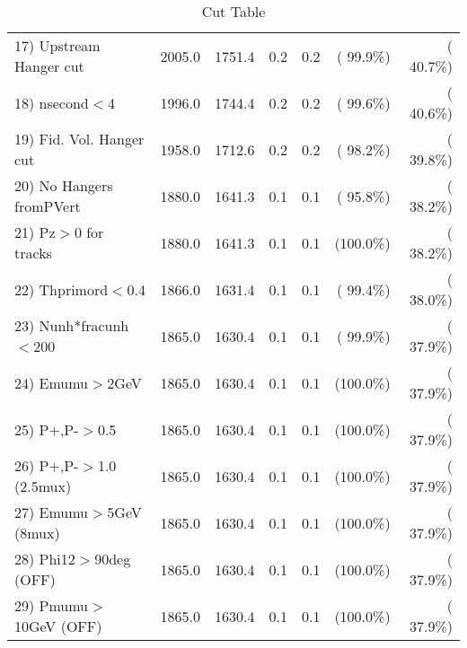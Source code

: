 \begin{table}[h!]
\begin{tabular}{||l||r|r|r|r|r|r||}
 17) Upstream Hanger cut  &       2005.0 &       1751.4 &          0.2 &          0.2 & ( 99.9\%) & ( 40.7\%) \\
 18) nsecond$<$4          &       1996.0 &       1744.4 &          0.2 &          0.2 & ( 99.6\%) & ( 40.6\%) \\
 19) Fid. Vol. Hanger cut &       1958.0 &       1712.6 &          0.2 &          0.2 & ( 98.2\%) & ( 39.8\%) \\
 20) No Hangers fromPVert &       1880.0 &       1641.3 &          0.1 &          0.1 & ( 95.8\%) & ( 38.2\%) \\
 21) Pz$>$0 for tracks    &       1880.0 &       1641.3 &          0.1 &          0.1 & (100.0\%) & ( 38.2\%) \\
 22) Thprimord$<$0.4      &       1866.0 &       1631.4 &          0.1 &          0.1 & ( 99.4\%) & ( 38.0\%) \\
 23) Nunh*fracunh$<$200   &       1865.0 &       1630.4 &          0.1 &          0.1 & ( 99.9\%) & ( 37.9\%) \\
 24) Emumu$>$2GeV         &       1865.0 &       1630.4 &          0.1 &          0.1 & (100.0\%) & ( 37.9\%) \\
 25) P+,P-$>$0.5          &       1865.0 &       1630.4 &          0.1 &          0.1 & (100.0\%) & ( 37.9\%) \\
 26) P+,P-$>$1.0 (2.5mux) &       1865.0 &       1630.4 &          0.1 &          0.1 & (100.0\%) & ( 37.9\%) \\
 27) Emumu$>$5GeV  (8mux) &       1865.0 &       1630.4 &          0.1 &          0.1 & (100.0\%) & ( 37.9\%) \\
 28) Phi12$>$90deg  (OFF) &       1865.0 &       1630.4 &          0.1 &          0.1 & (100.0\%) & ( 37.9\%) \\
 29) Pmumu$>$10GeV  (OFF) &       1865.0 &       1630.4 &          0.1 &          0.1 & (100.0\%) & ( 37.9\%) \\
 \hline
 \hline
 \end{tabular}
 \caption{Cut Table           }
 \label{tab-cutcohjpsi-mumu_jpsi}
 \end{table}
